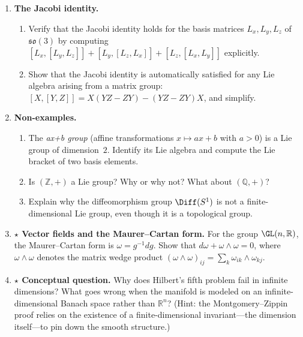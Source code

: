 \begin{enumerate}
    \item \textbf{The Jacobi identity.}
    \begin{enumerate}
        \item Verify that the Jacobi identity holds for the basis matrices $L_x, L_y, L_z$ of $\mathfrak{so}(3)$ by computing $[L_x, [L_y, L_z]] + [L_y, [L_z, L_x]] + [L_z, [L_x, L_y]]$ explicitly.
        \item Show that the Jacobi identity is automatically satisfied for any Lie algebra arising from a matrix group: $[X,[Y,Z]] = X(YZ - ZY) - (YZ - ZY)X$, and simplify.
    \end{enumerate}

    \item \textbf{Non-examples.}
    \begin{enumerate}
        \item The \emph{ax+b group} (affine transformations $x \mapsto ax + b$ with $a > 0$) is a Lie group of dimension~$2$. Identify its Lie algebra and compute the Lie bracket of two basis elements.
        \item Is $(\mathbb{Z}, +)$ a Lie group? Why or why not? What about $(\mathbb{Q}, +)$?
        \item Explain why the diffeomorphism group $\Diff(S^1)$ is not a finite-dimensional Lie group, even though it is a topological group.
    \end{enumerate}

    \item \textbf{$\star$ Vector fields and the Maurer--Cartan form.} For the group $\GL(n,\mathbb{R})$, the Maurer--Cartan form is $\omega = g^{-1} dg$. Show that $d\omega + \omega \wedge \omega = 0$, where $\omega \wedge \omega$ denotes the matrix wedge product $(\omega \wedge \omega)_{ij} = \sum_k \omega_{ik} \wedge \omega_{kj}$.

    \item \textbf{$\star$ Conceptual question.} Why does Hilbert's fifth problem fail in infinite dimensions? What goes wrong when the manifold is modeled on an infinite-dimensional Banach space rather than $\mathbb{R}^n$? (Hint: the Montgomery--Zippin proof relies on the existence of a finite-dimensional invariant---the dimension itself---to pin down the smooth structure.)
\end{enumerate}
